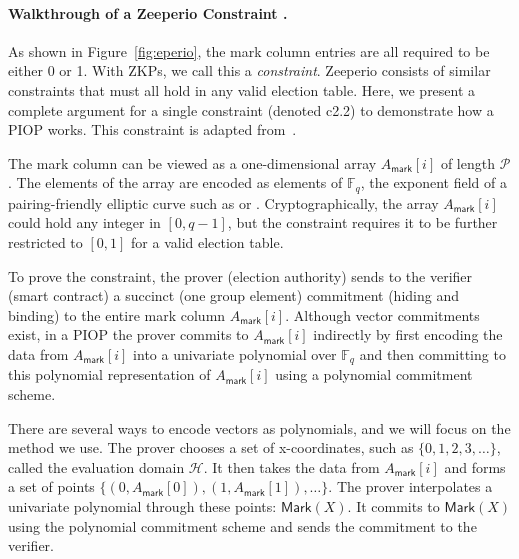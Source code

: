 \paragraph{Walkthrough of a Zeeperio Constraint .}
As shown in Figure~\ref{fig:eperio}, the mark column entries are all required to be either 0 or 1. 
With ZKPs, we call this a \textit{constraint}. 
Zeeperio consists of \constraints similar constraints that must all hold in any valid election table. 
Here, we present a complete argument for a single constraint (denoted c2.2) to demonstrate how a PIOP works. 
This constraint is adapted from~\cite{BFGW19}. 

The mark column can be viewed as a one-dimensional array $A_\mathsf{mark}[i]$ of length $\mathcal{P}$. 
The elements of the array are encoded as elements of $\mathbb{F}_q$, the exponent field of a pairing-friendly elliptic curve such as \altbn or \bls. 
Cryptographically, the array $A_\mathsf{mark}[i]$ could hold any integer in $[0,q-1]$, but the constraint requires it to be further restricted to $[0,1]$ for a valid election table.

To prove the constraint, the prover (election authority) sends to the verifier (smart contract) a succinct (one group element) commitment (hiding and binding) to the entire mark column $A_\mathsf{mark}[i]$. 
Although vector commitments exist, in a PIOP the prover commits to $A_\mathsf{mark}[i]$ indirectly by first encoding the data from $A_\mathsf{mark}[i]$ into a univariate polynomial over $\mathbb{F}_q$ and then committing to this polynomial representation of $A_\mathsf{mark}[i]$ using a polynomial commitment scheme.

There are several ways to encode vectors as polynomials, and we will focus on the method we use. 
The prover chooses a set of x-coordinates, such as $\{0,1,2,3,\ldots\}$, called the evaluation domain $\mathcal{H}$. 
It then takes the data from $A_\mathsf{mark}[i]$ and forms a set of points $\{(0,A_\mathsf{mark}[0]),(1,A_\mathsf{mark}[1]),\ldots\}$. 
The prover interpolates a univariate polynomial through these points: $\mathsf{Mark}(X)$. 
It commits to $\mathsf{Mark}(X)$ using the polynomial commitment scheme and sends the commitment to the verifier.

